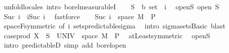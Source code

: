 \begin{isabellebody}
%
\isadelimproof
%
\endisadelimproof
%
\isatagproof
{}\isamarkupfalse%
\ {\isacharparenleft}{\kern0pt}unfold{\isacharunderscore}{\kern0pt}locales{\isacharcomma}{\kern0pt}\ intro\ borel{\isacharunderscore}{\kern0pt}measurableI{\isacharparenright}{\kern0pt}\isanewline
\ \ \isamarkupfalse%
\ S\ {\isacharcolon}{\kern0pt}{\isacharcolon}{\kern0pt}\ {\isachardoublequoteopen}{\isacharprime}{\kern0pt}b\ set{\isachardoublequoteclose}\ \ i\ \isamarkupfalse%
\ open{\isacharunderscore}{\kern0pt}S{\isacharcolon}{\kern0pt}\ {\isachardoublequoteopen}open\ S{\isachardoublequoteclose}\isanewline
\ \ \isamarkupfalse%
\ {\isachardoublequoteopen}{\isacharbraceleft}{\kern0pt}Suc\ i{\isacharbraceright}{\kern0pt}\ {\isacharequal}{\kern0pt}\ {\isacharbraceleft}{\kern0pt}i{\isacharless}{\kern0pt}{\isachardot}{\kern0pt}{\isachardot}{\kern0pt}Suc\ i{\isacharbraceright}{\kern0pt}{\isachardoublequoteclose}\ \isamarkupfalse%
\ fastforce\isanewline
\ \ \isamarkupfalse%
\ {\isachardoublequoteopen}{\isacharbraceleft}{\kern0pt}Suc\ i{\isacharbraceright}{\kern0pt}\ {\isasymtimes}\ space\ M\ {\isasymin}\ {\isasymSigma}\isactrlsub P{\isachardoublequoteclose}\ \isamarkupfalse%
\ space{\isacharunderscore}{\kern0pt}F{\isacharbrackleft}{\kern0pt}symmetric{\isacharcomma}{\kern0pt}\ of\ i{\isacharbrackright}{\kern0pt}\ sets{\isacharunderscore}{\kern0pt}predictable{\isacharunderscore}{\kern0pt}sigma\ \isamarkupfalse%
\ {\isacharparenleft}{\kern0pt}intro\ sigma{\isacharunderscore}{\kern0pt}sets{\isachardot}{\kern0pt}Basic{\isacharparenright}{\kern0pt}\ blast\isanewline
\ \ \isamarkupfalse%
\ \isamarkupfalse%
\ {\isachardoublequoteopen}case{\isacharunderscore}{\kern0pt}prod\ X\ {\isacharminus}{\kern0pt}{\isacharbackquote}{\kern0pt}\ S\ {\isasyminter}\ {\isacharparenleft}{\kern0pt}UNIV\ {\isasymtimes}\ space\ M{\isacharparenright}{\kern0pt}\ {\isasymin}\ {\isasymSigma}\isactrlsub P{\isachardoublequoteclose}\ \isamarkupfalse%
\ atLeast{\isacharunderscore}{\kern0pt}{}{\isacharbrackleft}{\kern0pt}symmetric{\isacharbrackright}{\kern0pt}\ \isamarkupfalse%
\ open{\isacharunderscore}{\kern0pt}S\ \isamarkupfalse%
\ {\isacharparenleft}{\kern0pt}intro\ predictableD{\isacharcomma}{\kern0pt}\ simp\ add{\isacharcolon}{\kern0pt}\ borel{\isacharunderscore}{\kern0pt}open{\isacharparenright}{\kern0pt}\isanewline
\ \ \isamarkupfalse%
\ \isamarkupfalse%

\end{isabellebody}
